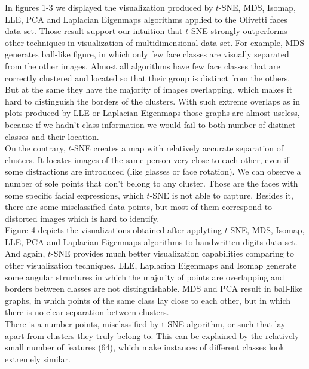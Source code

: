 In figures 1-3 we displayed the visualization produced by $t$-SNE, MDS, Isomap, LLE, PCA and Laplacian Eigenmaps algorithms applied to the Olivetti faces data set. Those result support our intuition that $t$-SNE strongly outperforms other techniques in visualization of multidimensional data set. For example, MDS generates ball-like figure, in which only few face classes are visually separated from the other images. Almost all algorithms have few face classes that are correctly clustered and located so that their group is distinct from the others. But at the same they have the majority of images overlapping, which makes it hard to distinguish the borders of the clusters. With such extreme overlaps as in plots produced by LLE or Laplacian Eigenmaps those graphs are almost useless, because if we hadn't class information we would fail to both number of distinct classes and their location. \\

On the contrary, $t$-SNE creates a map with relatively accurate separation of clusters. It locates images of the same person very close to each other, even if some distractions are introduced (like glasses or face rotation). We can observe a number of sole points that don't belong to any cluster. Those are the faces with some specific facial expressions, which $t$-SNE is not able to capture. Besides it, there are some misclassified data points, but most of them correspond to distorted images which is hard to identify.\\

Figure 4 depicts the visualizations obtained after applyting $t$-SNE, MDS, Isomap, LLE, PCA and Laplacian Eigenmaps algorithms to handwritten digits data set. And again, $t$-SNE provides much better visualization capabilities comparing to other visualization techniques. LLE, Laplacian Eigenmaps and Isomap generate some angular structures in which the majority of points are overlapping and borders between classes are not distinguishable. MDS and PCA result in ball-like graphs, in which points of the same class lay close to each other, but in which there is no clear separation between clusters. \\

There is a number points, misclassified by t-SNE algorithm, or such that lay apart from clusters they truly belong to. This can be explained by the relatively small number of features (64), which make instances of different classes look extremely similar.\\

